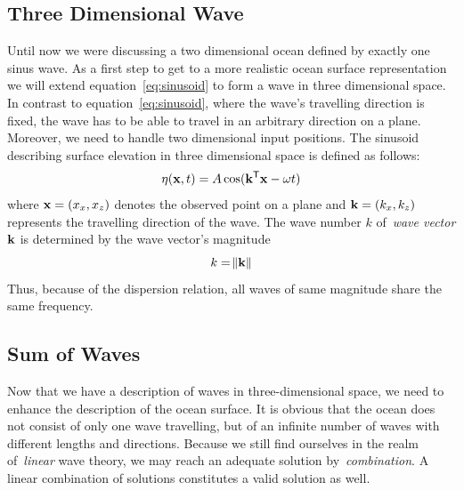 \subsection{Three Dimensional Wave}
Until now we were discussing a two dimensional ocean defined by exactly one sinus wave. As a first
step to get to a more realistic ocean surface representation we will extend equation~\ref{eq:sinusoid}
to form a wave in three dimensional space. In contrast to equation~\ref{eq:sinusoid}, where the wave's
travelling direction is fixed, the wave has to be able to travel in an arbitrary direction on a plane.
Moreover, we need to handle two dimensional input positions. The sinusoid describing surface elevation
in three dimensional space is defined as follows:
\begin{equation}
\label{eq:sinusoid_3d}
 \eta(\mathbf{x}, t) = A\cos(\mathbf{k}^{\mathsf{T}}\mathbf{x} - \omega t)
\end{equation}
where $\mathbf{x} = (x_x, x_z)$ denotes the observed point on a plane and $\mathbf{k} = (k_x, k_z)$ represents
the travelling direction of the wave. The wave number $k$ of~\emph{wave vector} $\mathbf{k}$ is determined by
the wave vector's magnitude
\begin{equation}
 k = \norm{\mathbf{k}}
\end{equation}
Thus, because of the dispersion relation, all waves of same magnitude share the same frequency.

\subsection{Sum of Waves}
Now that we have a description of waves in three-dimensional space, we need to
enhance the description of the ocean surface. It is obvious that the ocean does
not consist of only one wave travelling, but of an infinite number of waves with
different lengths and directions. Because we still find ourselves in the realm
of~\emph{linear} wave theory, we may reach an adequate solution
by~\emph{combination}. A linear combination of solutions constitutes a valid
solution as well.\\

